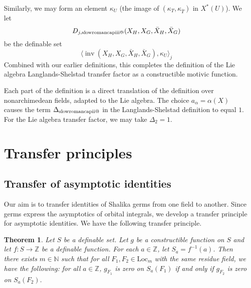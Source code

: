\documentclass[12pt]{amsart}
\makeatletter
\newcommand*{\rom}[1]{\text{\expandafter\@slowromancap\romannumeral #1@}}
\newcommand{\op}[1]{\operatorname{#1}}
\newcommand{\ring}[1]{{\mathbb #1}}
\newcommand{\Loc}{\mathrm{Loc}}
\theoremstyle{plain}
\newtheorem{theorem}[thm]{Theorem}
\theoremstyle{definition}
\makeatother
\begin{document}
Similarly, we may form an element $\kappa_U$ (the image of
$(\kappa_T,\kappa_{\bar T})$ in $X^*(U)$).  We let
\[
D_{j,\rom{3}}(X_H,X_G,\bar X_H,\bar X_G)
\]
 be the definable set
\[
\langle \op{inv}(X_H,X_G,\bar
X_H,\bar X_G),\kappa_{U}\rangle_j
\]
Combined with our earlier definitions, this completes the definition
of the Lie algebra Langlands-Shelstad transfer factor as a
constructible motivic function.


Each part of the definition is a direct translation of the definition
over nonarchimedean fields, adapted to the Lie algebra.  The choice
$a_\alpha = \alpha(X)$ causes the term $\Delta_{\rom2}$ in the
Langlands-Shelstad definition to equal $1$.  For the Lie algebra
transfer factor, we may take $\Delta_{2}=1$.

\section{Transfer principles}

\subsection{Transfer of asymptotic identities}

Our aim is to transfer identities of Shalika germs from
one field to another.  Since germs express the asymptotics of
orbital integrals, we develop a transfer principle for
asymptotic identities.  We have the following transfer principle.

\begin{theorem} \label{thm:asym}
Let $S$ be a definable set.    
Let $g$ be a constructible function on $S$ and let
  $f:S\to \ring{Z}$ be a definable function.  For each $a\in\ring{Z}$,
let $S_a = f^{-1}(a)$.  Then there exists 
  $m\in\ring{N}$ such that for all $F_1,F_2\in\Loc_m$ with the same
  residue field, we have the following: for all $a\in\ring{Z}$, 
  $g_{F_1}$ is zero on $S_a(F_1)$ if and only if $g_{F_2}$ is zero
  on $S_a(F_2)$.
\end{theorem}
\end{document}

